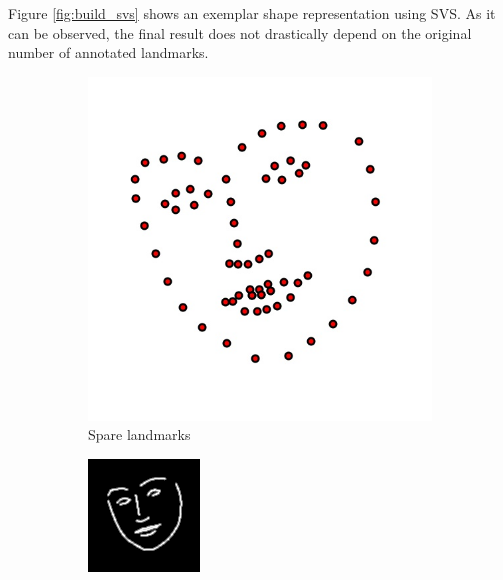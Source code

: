 Figure \ref{fig:build_svs} shows an exemplar shape representation using SVS. As it can be observed, the final result does not drastically depend on the original number of annotated landmarks.


\begin{figure}[b!]
    \centering
    \begin{subfigure}[b]{0.2\textwidth}
            \includegraphics[width=\textwidth]{resources/landmark}
        \caption{Spare landmarks}
    \end{subfigure}
    \qquad
    \begin{subfigure}[b]{0.2\textwidth}
            \includegraphics[width=\textwidth]{resources/svs}

\end{subfigure}
\end{figure}
